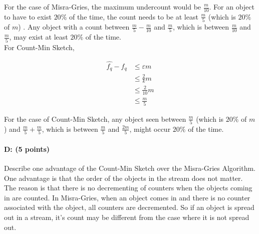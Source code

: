 \documentclass[11pt]{article}
\begin{document}
For the case of Misra-Gries, the maximum undercount would be $\frac{m}{10}$. For an object to have to exist $20\%$ of the time, the count needs to be at least $\frac{m}{5}$ (which is $20\%$ of $m$) .  Any object with a count between $\frac{m}{5} -\frac{m}{10}$ and $\frac{m}{5}$, which is between $\frac{m}{10}$ and $\frac{m}{5}$, may exist at least $20\%$ of the time. \\

For Count-Min Sketch,

\begin{equation*}
\begin{aligned}
\hat{f_q} - f_q  &\leq \varepsilon m\\
&\leq \frac{2}{k} m\\
&\leq \frac{2}{10} m\\
&\leq \frac{m}{5} 
\end{aligned}
\end{equation*}

For the case of Count-Min Sketch, any object seen between $\frac{m}{5}$ (which is $20\%$ of $m$) and $\frac{m}{5} +  \frac{m}{5}$, which is between $\frac{m}{5}$ and $\frac{2m}{5}$, might occur $20\%$ of the time.


\paragraph{D: (5 points)} 
Describe one advantage of the Count-Min Sketch over the Misra-Gries Algorithm.\\

One advantage is that the order of the objects in the stream does not matter. The reason is that there is no decrementing of counters when the objects coming in are counted. In Misra-Gries, when an object comes in and there is no counter associated with the object, all counters are decremented. So if an object is spread out in a stream, it's count may be different from the case where it is not spread out.
\end{document}
